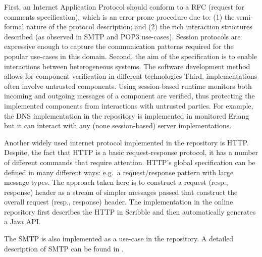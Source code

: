First, an Internet Application Protocol should conform to
a RFC (request for comments specification), which is an error prone
procedure due to:
(1) the semi-formal nature of the protocol description; and
(2) the rich interaction structures described
(as observed in SMTP and POP3 use-cases).
Session protocols %
are expressive enough to capture the communication
patterns required for the popular use-cases in this domain.  
Second, the aim of the specification is to enable
interactions between heterogeneous systems.
The software development method allows for component
verification in different technologies
Third, implementations often involve untrusted components.
Using session-based runtime monitors both incoming and outgoing
messages of a component are verified, thus protecting the
implemented components from interactions with untrusted parties.
For example, the DNS implementation in the repository
is implemented in monitored Erlang but it can interact with any
(none session-based) server implementations. 

Another widely used internet protocol implemented in the repository is HTTP.
Despite, the fact that HTTP is a basic request-response protocol,
it has a number of different commands that require attention.
HTTP's global specification can be defined in many different ways:
e.g.~a request/response pattern with large message types. The approach
taken here is to construct a request (resp., response) header as
a stream of simpler messages passed that construct the overall
request (resp., response) header. The implementation in the online
repository first describes the HTTP in Scribble and then automatically
generates a Java API.

The SMTP is also implemented as a use-case in the repository.
A detailed description of SMTP can be found in .






